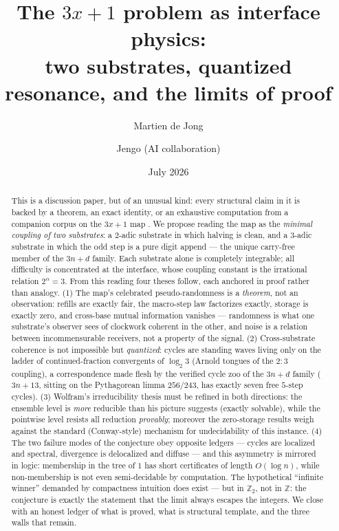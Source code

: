 \documentclass[11pt]{article}
\title{The $3x+1$ problem as interface physics:\\
two substrates, quantized resonance, and the limits of proof}
\author{Martien de Jong \and Jengo (AI collaboration)}
\date{July 2026}
\theoremstyle{definition}
\theoremstyle{remark}
\newcommand{\Z}{\mathbb{Z}}
\newcommand{\Ztwo}{\mathbb{Z}_2}
\begin{document}
\maketitle

\begin{abstract}
This is a discussion paper, but of an unusual kind: every structural claim in it
is backed by a theorem, an exact identity, or an exhaustive computation from a
companion corpus on the $3x+1$ map \cite{Note2026, Forgetful2026, CstComma2026,
Tempering2026, Drift2026, GammaOne2026}. We propose reading the map as the
\emph{minimal coupling of two substrates}: a $2$-adic substrate in which halving
is clean, and a $3$-adic substrate in which the odd step is a pure digit append
--- the unique carry-free member of the $3n+d$ family. Each substrate alone is
completely integrable; all difficulty is concentrated at the interface, whose
coupling constant is the irrational relation $2^{\alpha}=3$. From this reading
four theses follow, each anchored in proof rather than analogy. (1) The map's
celebrated pseudo-randomness is a \emph{theorem}, not an observation: refills
are exactly fair, the macro-step law factorizes exactly, storage is exactly
zero, and cross-base mutual information vanishes --- randomness is what one
substrate's observer sees of clockwork coherent in the other, and noise is a
relation between incommensurable receivers, not a property of the signal.
(2) Cross-substrate coherence is not impossible but \emph{quantized}: cycles
are standing waves living only on the ladder of continued-fraction convergents
of $\log_2 3$ (Arnold tongues of the $2{:}3$ coupling), a correspondence made
flesh by the verified cycle zoo of the $3n+d$ family ($3n+13$, sitting on the
Pythagorean limma $256/243$, has exactly seven free $5$-step cycles).
(3) Wolfram's irreducibility thesis must be refined in both directions: the
ensemble level is \emph{more} reducible than his picture suggests (exactly
solvable), while the pointwise level resists all reduction \emph{provably};
moreover the zero-storage results weigh against the standard (Conway-style)
mechanism for undecidability of this instance. (4) The two failure modes of the
conjecture obey opposite ledgers --- cycles are localized and spectral,
divergence is delocalized and diffuse --- and this asymmetry is mirrored in
logic: membership in the tree of $1$ has short certificates of length
$O(\log n)$, while non-membership is not even semi-decidable by computation.
The hypothetical ``infinite winner'' demanded by compactness intuition does
exist --- but in $\Ztwo$, not in $\Z$: the conjecture is exactly the statement
that the limit always escapes the integers. We close with an honest ledger of
what is proved, what is structural template, and the three walls that remain.
\end{abstract}
\end{document}
